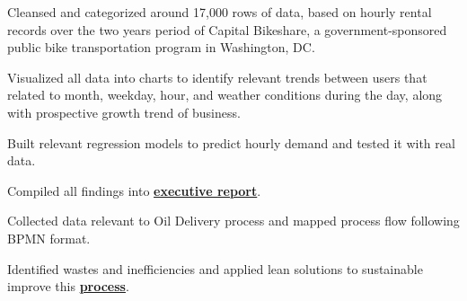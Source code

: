 \documentclass[letterpaper]{deedy-resume} %
\begin{document}
\begin{minipage}[t]{0.66\textwidth}
\sectionspace %


\begin{tightitemize}
\item Cleansed and categorized around 17,000 rows of data, based on hourly rental records over the two years period of Capital Bikeshare, a government-sponsored public bike transportation program in Washington, DC.
\item Visualized all data into charts to identify relevant trends between users that related to month, weekday, hour, and weather conditions during the day, along with prospective growth trend of business.
\item Built relevant regression models to predict hourly demand and tested it with real data.
\item Compiled all findings into \href{https://drive.google.com/file/d/0B7mZbJb-qiSUb2ppbndiNGplbnc/view?usp=sharing}{\bf executive report}.
\end{tightitemize}
\sectionspace %

\begin{tightitemize}
\item Collected data relevant to Oil Delivery process and mapped process flow following BPMN format.\\
\item Identified wastes and inefficiencies and applied lean solutions to sustainable improve this \href{https://drive.google.com/file/d/0B7mZbJb-qiSUZnRkdDBJTlozUkU/view?usp=sharing}{\bf process}.
\end{tightitemize}
\sectionspace %


\end{minipage}
\end{document}
